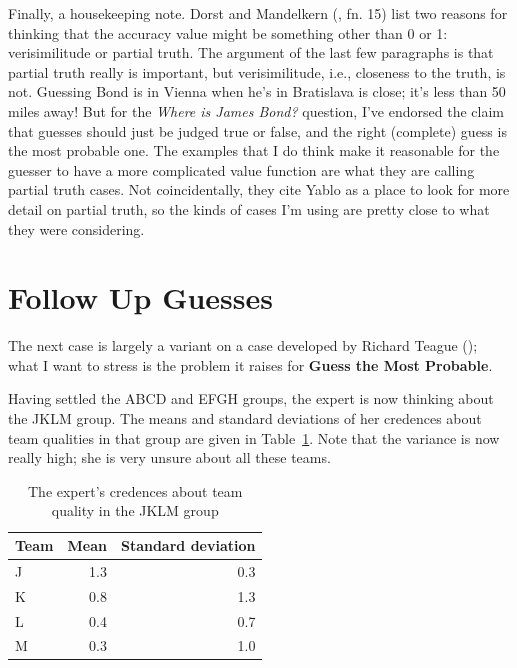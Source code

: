 \documentclass[
  11pt,
  letterpaper,
  DIV=11,
  numbers=noendperiod,
  twoside]{scrartcl}
\begin{document}
Finally, a housekeeping note. Dorst and Mandelkern
(, fn. 15) list two reasons for
thinking that the accuracy value might be something other than 0 or 1:
verisimilitude or partial truth. The argument of the last few paragraphs
is that partial truth really is important, but verisimilitude, i.e.,
closeness to the truth, is not. Guessing Bond is in Vienna when he's in
Bratislava is close; it's less than 50 miles away! But for the
\emph{Where is James Bond?} question, I've endorsed the claim that
guesses should just be judged true or false, and the right (complete)
guess is the most probable one. The examples that I do think make it
reasonable for the guesser to have a more complicated value function are
what they are calling partial truth cases. Not coincidentally, they cite
Yablo as a place to look for more detail on partial truth, so the kinds
of cases I'm using are pretty close to what they were considering.

\section{Follow Up Guesses}\label{sec-follow}

The next case is largely a variant on a case developed by Richard Teague
(); what I want to stress is the problem
it raises for \textbf{Guess the Most Probable}.

Having settled the ABCD and EFGH groups, the expert is now thinking
about the JKLM group. The means and standard deviations of her credences
about team qualities in that group are given in
Table~\ref{tbl-quality-sec-2}. Note that the variance is now really
high; she is very unsure about all these teams.

{

\begin{longtable}[]{@{}lrr@{}}

\caption{\label{tbl-quality-sec-2}The expert's credences about team
quality in the JKLM group}

\tabularnewline

\toprule\noalign{}
Team & Mean & Standard deviation \\
\midrule\noalign{}
\endhead
\bottomrule\noalign{}
\endlastfoot
J & 1.3 & 0.3 \\
K & 0.8 & 1.3 \\
L & 0.4 & 0.7 \\
M & 0.3 & 1.0 \\

\end{longtable}

}
\end{document}
